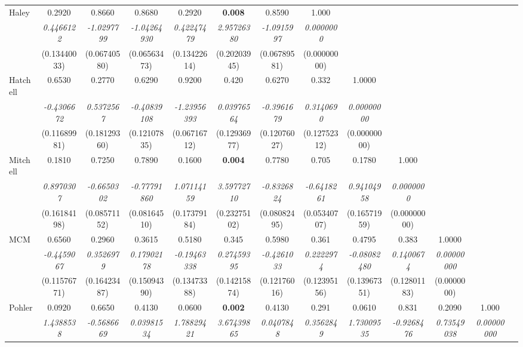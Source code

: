 \documentclass[review]{elsarticle}
\begin{document}
\begin{table}
\begin{tabular}{lcccccccccccc}
Haley & 0.2920 & 0.8660 & 0.8680 & 0.2920 & \textbf{0.008} & 0.8590 & 1.000 &  &  &  &  &\\
 & \textit{0.4466122} & \textit{-1.0297799} & \textit{-1.04264930} & \textit{0.42247479} & \textit{2.95726380} & \textit{-1.0915997} & \textit{0.0000000} &  &  &  &  & \\
 & (0.13440033) & (0.06740580) & (0.06563473) & (0.13422614) & (0.20203945) & (0.06789581) & (0.00000000) &  &  &  &  & \\
Hatchell & 0.6530 & 0.2770 & 0.6290 & 0.9200 & 0.420 & 0.6270 & 0.332 & 1.0000 & &  &  & \\
 & \textit{-0.4306672} & \textit{0.5372567} & \textit{-0.40839108} & \textit{-1.23956393} & \textit{0.03976564} & \textit{-0.3961679} & \textit{0.3140690} & \textit{0.00000000} &  &  &   & \\
 & (0.11689981) & (0.18129360) & (0.12107835) & (0.06716712) & (0.12936977) & (0.12076027) & (0.12752312) & (0.00000000) &  &  &  & \\
Mitchell & 0.1810 & 0.7250 & 0.7890 & 0.1600 & \textbf{0.004} & 0.7780 & 0.705 & 0.1780 & 1.000 & &  & \\
 & \textit{0.8970307} & \textit{-0.6650302} & \textit{-0.77791860} & \textit{1.07114159} & \textit{3.59772710} & \textit{-0.8326824} & \textit{-0.6418261} & \textit{0.94104958} & \textit{0.0000000} &  &  & \\
 & (0.16184198) & (0.08571152) & (0.08164510) & (0.17379184) & (0.23275102) & (0.08082495) & (0.05340707) & (0.16571959) & (0.00000000) &  &  & \\
MCM & 0.6560 & 0.2960 & 0.3615 & 0.5180 & 0.345 & 0.5980 & 0.361 & 0.4795 & 0.383 & 1.0000 & & \\
 & \textit{-0.4459067} & \textit{0.3526979} & \textit{0.17902178} & \textit{-0.19463338} & \textit{0.27459395} & \textit{-0.4261033} & \textit{0.2222974} & \textit{-0.08082480} & \textit{0.1400674} & \textit{0.00000000} &  & \\
 & (0.11576771) & (0.16423487) & (0.15094390) & (0.13473388) & (0.14215874) & (0.12176016) & (0.12395156) & (0.13967351) & (0.12801183) & (0.0000000) &  & \\
Pohler & 0.0920 & 0.6650 & 0.4130 & 0.0600 & \textbf{0.002} & 0.4130 & 0.291 & 0.0610 & 0.831 & 0.2090 & 1.000 & \\
 & \textit{1.4388538} & \textit{-0.5686669} & \textit{0.03981534} & \textit{1.78829421} & \textit{3.67439865} & \textit{0.0407848} & \textit{0.3562849} & \textit{1.73009535} & \textit{-0.9268476} & \textit{0.73549038} & \textit{0.00000000} & \\

\end{tabular}
\end{table}
\end{document}
